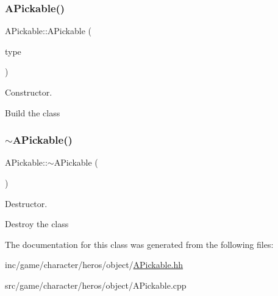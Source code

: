 \subsubsection{\texorpdfstring{A\+Pickable()}{APickable()}}
{\footnotesize\ttfamily A\+Pickable\+::\+A\+Pickable (\begin{DoxyParamCaption}\item[{indie\+::object\+Type}]{type }\end{DoxyParamCaption})}



Constructor. 

Build the class \mbox{\label{classAPickable_a145013963070158596ad2e0d07065f5d}} 
\subsubsection{\texorpdfstring{$\sim$\+A\+Pickable()}{~APickable()}}
{\footnotesize\ttfamily A\+Pickable\+::$\sim$\+A\+Pickable (\begin{DoxyParamCaption}{ }\end{DoxyParamCaption})}



Destructor. 

Destroy the class 

The documentation for this class was generated from the following files\+:\begin{DoxyCompactItemize}
\item 
inc/game/character/heros/object/\hyperlink{APickable_8hh}{A\+Pickable.\+hh}\item 
src/game/character/heros/object/A\+Pickable.\+cpp\end{DoxyCompactItemize}
